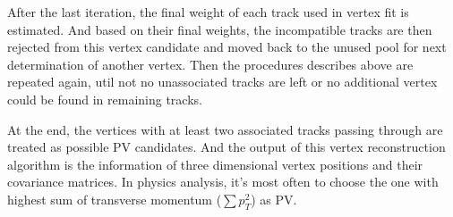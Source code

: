 After the last iteration, the final weight of each track used in vertex fit is estimated. 
And based on their final weights, the incompatible tracks are then rejected from this vertex candidate and moved back to the unused pool for next determination of another vertex.
Then the procedures describes above are repeated again, util not no unassociated tracks are left or no additional vertex could be found in remaining tracks.

At the end, the vertices with at least two associated tracks passing through are treated as possible PV candidates.
And the output of this vertex reconstruction algorithm is the information of three dimensional vertex positions and their covariance matrices.
In physics analysis, it's most often to choose the one with highest sum of transverse momentum ($\sum{p_{T}^{2}}$) as PV.
